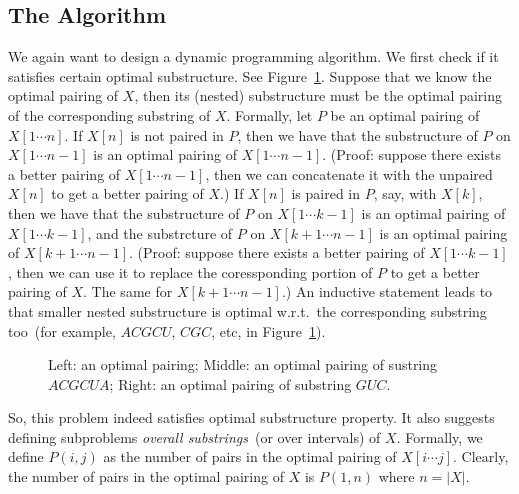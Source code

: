 \documentclass[letterpaper,11pt]{article}
\theoremstyle{mytheorem}
\begin{document}
\subsection*{The Algorithm}

We again want to design a dynamic programming algorithm.
We first check if it satisfies certain optimal substructure.
See Figure~\ref{fig:optimal}.
Suppose that we know the optimal pairing of $X$,
then its (nested) substructure must be the optimal
pairing of the corresponding substring of $X$.
Formally, let $P$ be an optimal pairing of $X[1\cdots n]$.
If $X[n]$ is not paired in $P$, then we have that
the substructure of $P$ on $X[1\cdots n - 1]$ is an optimal
pairing of $X[1\cdots n - 1]$. (Proof: suppose there exists
a better pairing of $X[1\cdots n - 1]$, then we can concatenate
it with the unpaired $X[n]$ to get a better pairing of $X$.)
If $X[n]$ is paired in $P$, say, with $X[k]$, then we have that
the substructure of $P$ on $X[1\cdots k - 1]$ is an optimal
pairing of $X[1\cdots k - 1]$, and 
the substrcture of $P$ on $X[k + 1\cdots n - 1]$ is an optimal
pairing of $X[k + 1\cdots n - 1]$. 
(Proof: suppose there exists
a better pairing of $X[1\cdots k - 1]$, then we can use it to replace
the coressponding portion of $P$ to 
get a better pairing of $X$. The same for $X[k + 1\cdots n - 1]$.)
An inductive statement leads to that smaller nested substructure
is optimal w.r.t.\ the corresponding substring too~(for example, 
		$ACGCU$, $CGC$, etc, in Figure~\ref{fig:optimal}).

\begin{figure}[h]
\centering{}
\caption{Left: an optimal pairing; Middle: an optimal pairing of sustring $ACGCUA$; Right: 
an optimal pairing of substring $GUC$.}
\label{fig:optimal}
\end{figure}

So, this problem indeed satisfies optimal substructure property.
It also suggests defining subproblems \emph{overall substrings}~(or over intervals) of $X$.
Formally, we define $P(i,j)$ as the number of pairs in the optimal pairing of $X[i\cdots j]$.
Clearly, the number of pairs in the optimal pairing of $X$ is $P(1,n)$ where $n = |X|$.
\end{document}
